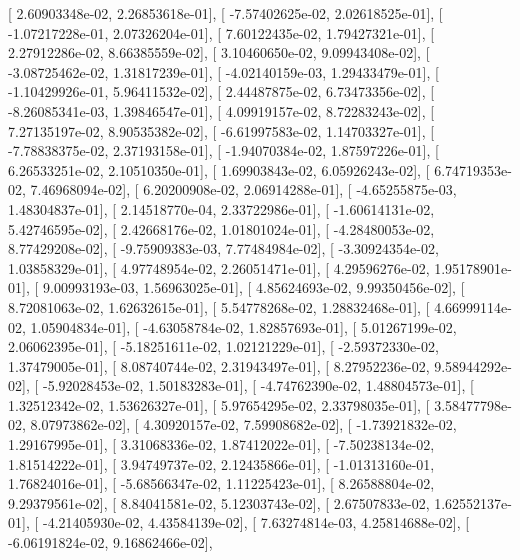 \documentclass{article}
\begin{document}
       [  2.60903348e-02,   2.26853618e-01],
       [ -7.57402625e-02,   2.02618525e-01],
       [ -1.07217228e-01,   2.07326204e-01],
       [  7.60122435e-02,   1.79427321e-01],
       [  2.27912286e-02,   8.66385559e-02],
       [  3.10460650e-02,   9.09943408e-02],
       [ -3.08725462e-02,   1.31817239e-01],
       [ -4.02140159e-03,   1.29433479e-01],
       [ -1.10429926e-01,   5.96411532e-02],
       [  2.44487875e-02,   6.73473356e-02],
       [ -8.26085341e-03,   1.39846547e-01],
       [  4.09919157e-02,   8.72283243e-02],
       [  7.27135197e-02,   8.90535382e-02],
       [ -6.61997583e-02,   1.14703327e-01],
       [ -7.78838375e-02,   2.37193158e-01],
       [ -1.94070384e-02,   1.87597226e-01],
       [  6.26533251e-02,   2.10510350e-01],
       [  1.69903843e-02,   6.05926243e-02],
       [  6.74719353e-02,   7.46968094e-02],
       [  6.20200908e-02,   2.06914288e-01],
       [ -4.65255875e-03,   1.48304837e-01],
       [  2.14518770e-04,   2.33722986e-01],
       [ -1.60614131e-02,   5.42746595e-02],
       [  2.42668176e-02,   1.01801024e-01],
       [ -4.28480053e-02,   8.77429208e-02],
       [ -9.75909383e-03,   7.77484984e-02],
       [ -3.30924354e-02,   1.03858329e-01],
       [  4.97748954e-02,   2.26051471e-01],
       [  4.29596276e-02,   1.95178901e-01],
       [  9.00993193e-03,   1.56963025e-01],
       [  4.85624693e-02,   9.99350456e-02],
       [  8.72081063e-02,   1.62632615e-01],
       [  5.54778268e-02,   1.28832468e-01],
       [  4.66999114e-02,   1.05904834e-01],
       [ -4.63058784e-02,   1.82857693e-01],
       [  5.01267199e-02,   2.06062395e-01],
       [ -5.18251611e-02,   1.02121229e-01],
       [ -2.59372330e-02,   1.37479005e-01],
       [  8.08740744e-02,   2.31943497e-01],
       [  8.27952236e-02,   9.58944292e-02],
       [ -5.92028453e-02,   1.50183283e-01],
       [ -4.74762390e-02,   1.48804573e-01],
       [  1.32512342e-02,   1.53626327e-01],
       [  5.97654295e-02,   2.33798035e-01],
       [  3.58477798e-02,   8.07973862e-02],
       [  4.30920157e-02,   7.59908682e-02],
       [ -1.73921832e-02,   1.29167995e-01],
       [  3.31068336e-02,   1.87412022e-01],
       [ -7.50238134e-02,   1.81514222e-01],
       [  3.94749737e-02,   2.12435866e-01],
       [ -1.01313160e-01,   1.76824016e-01],
       [ -5.68566347e-02,   1.11225423e-01],
       [  8.26588804e-02,   9.29379561e-02],
       [  8.84041581e-02,   5.12303743e-02],
       [  2.67507833e-02,   1.62552137e-01],
       [ -4.21405930e-02,   4.43584139e-02],
       [  7.63274814e-03,   4.25814688e-02],
       [ -6.06191824e-02,   9.16862466e-02],
\end{document}
